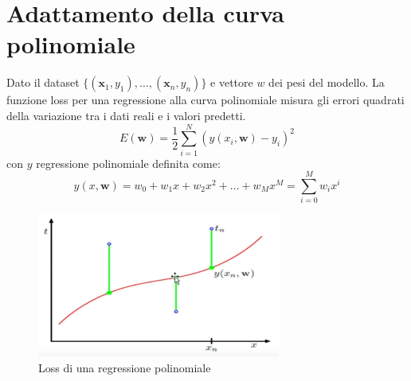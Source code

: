 \documentclass[
	a4paper,
	11pt,
	oneside
]{book}
\theoremstyle{std}
\begin{document}
	\section{Adattamento della curva polinomiale}
	\begin{definition}[Loss]
		\label{definition:fitting.polynomial.loss}
		Dato il dataset $ \{(\textbf{x}_1, y_1), \ldots, (\textbf{x}_n, y_n)\} $ e vettore $ w $ dei pesi del modello.
		La funzione loss per una regressione alla curva polinomiale misura gli errori quadrati della variazione tra i dati reali e i valori predetti.
		$$
			E(\textbf{w}) = \frac{1}{2} \sum_{i=1}^N \left(y(x_i, \textbf{w}) - y_i\right)^2
		$$
		con $ y $ regressione polinomiale definita come:
		$$
			y(x, \textbf{w}) = w_0 + w_1 x + w_2 x^2 + \ldots + w_M x^M
			= \sum_{i=0}^M w_i x^i
		$$
	\end{definition}
	\begin{figure}[H]
		\centering
		\includegraphics[width = 8cm]{polynomial_loss.png}
		\caption{Loss di una regressione polinomiale}
	\end{figure}
	
\end{document}
